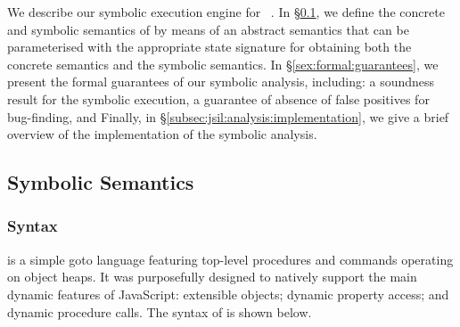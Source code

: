 
We describe our symbolic execution engine for \jsil~\cite{javert}. 
In \S\ref{subsec:jsil:analysis:formalism}, we define the concrete 
and symbolic semantics of \jsil by means of an 
abstract semantics that can be parameterised with the appropriate state signature for
obtaining both the concrete semantics and the symbolic semantics.
In \S\ref{sex:formal:guarantees}, we present the formal guarantees of 
our symbolic analysis, including:  a soundness result for the symbolic 
execution,  a guarantee of absence of false positives for bug-finding, 
and   
Finally, in \S\ref{subsec:jsil:analysis:implementation}, we give a brief overview
of the implementation of the \jsil symbolic analysis. %


\subsection{Symbolic Semantics}\label{subsec:jsil:analysis:formalism}

\subsubsection{Syntax} 
\jsil is a simple goto language featuring top-level procedures and commands operating on object heaps. It was purposefully designed to natively support the main dynamic features of JavaScript: extensible objects; dynamic property access; and dynamic procedure calls. The syntax of \jsil is shown below. 

